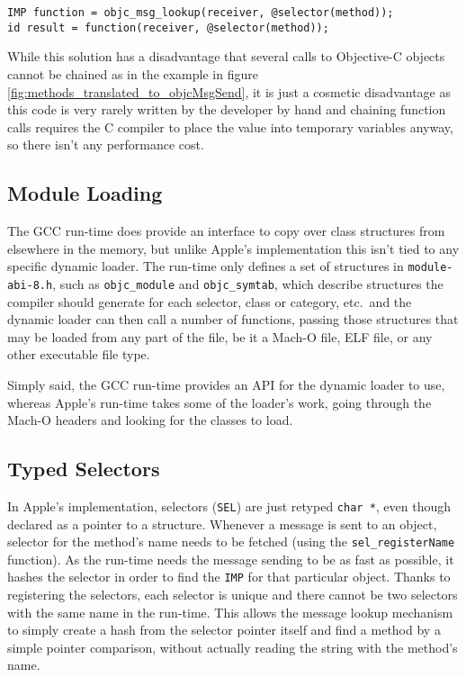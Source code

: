 \begin{verbatim}
IMP function = objc_msg_lookup(receiver, @selector(method));
id result = function(receiver, @selector(method));
\end{verbatim}

While this solution has a disadvantage that several calls to Objective-C objects cannot be chained as in the example in figure \ref{fig:methods_translated_to_objcMsgSend}, it is just a cosmetic disadvantage as this code is very rarely written by the developer by hand and chaining function calls requires the C compiler to place the value into temporary variables anyway, so there isn't any performance cost.

\subsection{Module Loading}

The GCC run-time does provide an interface to copy over class structures from elsewhere in the memory, but unlike Apple's implementation this isn't tied to any specific dynamic loader. The run-time only defines a set of structures in \verb=module-abi-8.h=, such as \verb=objc_module= and \verb=objc_symtab=, which describe structures the compiler should generate for each selector, class or category, etc.\ and the dynamic loader can then call a number of functions, passing those structures that may be loaded from any part of the file, be it a Mach-O file, ELF file, or any other executable file type.

Simply said, the GCC run-time provides an API for the dynamic loader to use, whereas Apple's run-time takes some of the loader's work, going through the Mach-O headers and looking for the classes to load.

\subsection{Typed Selectors}

In Apple's implementation, selectors (\verb=SEL=) are just retyped \verb=char *=, even though declared as a pointer to a structure. Whenever a message is sent to an object, selector for the method's name needs to be fetched (using the \verb=sel_registerName= function). As the run-time needs the message sending to be as fast as possible, it hashes the selector in order to find the \verb=IMP= for that particular object. Thanks to registering the selectors, each selector is unique and there cannot be two selectors with the same name in the run-time. This allows the message lookup mechanism to simply create a hash from the selector pointer itself and find a method by a simple pointer comparison, without actually reading the string with the method's name.

